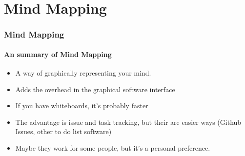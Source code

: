 \section{Mind Mapping}

\begin{frame}
    \frametitle{Mind Mapping}
    \framesubtitle{An summary of Mind Mapping}
    \begin{itemize}
    		\item A way of graphically representing your mind.
    		\item Adds the overhead in the graphical software interface
    		\item If you have whiteboards, it's probably faster
    		\item The advantage is issue and task tracking, but their are easier ways (Github Issues, other to do list software)
    		\item Maybe they work for some people, but it's a personal preference. 
    \end{itemize}
\end{frame}